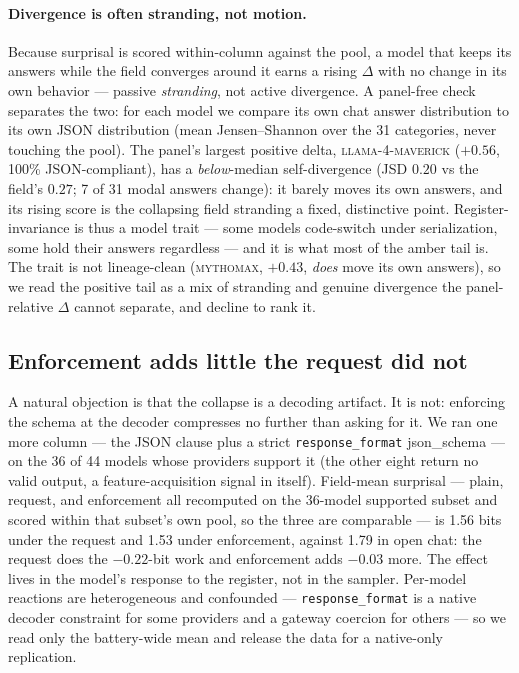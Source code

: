 \documentclass[11pt]{article}
\begin{document}
\paragraph{Divergence is often stranding, not motion.}
Because surprisal is scored within-column against the pool, a model that keeps its answers while
the field converges around it earns a rising $\Delta$ with no change in its own behavior ---
passive \emph{stranding}, not active divergence. A panel-free check separates the two: for each
model we compare its own chat answer distribution to its own JSON distribution (mean
Jensen--Shannon over the 31 categories, never touching the pool). The panel's largest positive
delta, \textsc{llama-4-maverick} ($+0.56$, 100\% JSON-compliant), has a \emph{below}-median
self-divergence (JSD $0.20$ vs the field's $0.27$; 7 of 31 modal answers change): it barely moves
its own answers, and its rising score is the collapsing field stranding a fixed, distinctive
point. Register-invariance is thus a model trait --- some models code-switch under serialization,
some hold their answers regardless --- and it is what most of the amber tail is. The trait is not
lineage-clean (\textsc{mythomax}, $+0.43$, \emph{does} move its own answers), so we read the
positive tail as a mix of stranding and genuine divergence the panel-relative $\Delta$ cannot
separate, and decline to rank it.

\subsection{Enforcement adds little the request did not}
\label{sec:enforced}
A natural objection is that the collapse is a decoding artifact. It is not: enforcing the schema
at the decoder compresses no further than asking for it. We ran one more column --- the JSON
clause plus a strict \texttt{response\_format} json\_schema --- on the 36 of 44 models whose
providers support it (the other eight return no valid output, a feature-acquisition signal in
itself). Field-mean surprisal --- plain, request, and enforcement all recomputed on the
36-model supported subset and scored within that subset's own pool, so the three are comparable ---
is 1.56 bits under the request and 1.53 under enforcement, against
1.79 in open chat: the request does the $-0.22$-bit work and enforcement adds $-0.03$ more. The
effect lives in the model's response to the register, not in the sampler. Per-model reactions are
heterogeneous and confounded --- \texttt{response\_format} is a native decoder constraint for
some providers and a gateway coercion for others --- so we read only the battery-wide mean and
release the data for a native-only replication.
\end{document}
